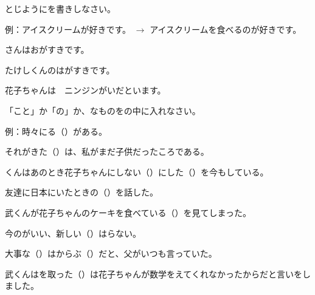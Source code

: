 
\author{Tomislav Mamić}

	
	\ten\begin{mondai}{とじようにを書きしなさい。}
		\itemsep0pt
		\item 例：アイスクリームが好きです。 $\rightarrow$ アイスクリームを食べるのが好きです。
		\item {}さんはおがすきです。
		\item たけしくんのは\hspace{10pt}がすきです。
		\item 花子ちゃんは　ニンジンがいだといます。
	\end{mondai}

	\vspace{20pt}
	\ten\begin{mondai}{「こと」か「の」か、なものをの中に入れなさい。}
		\itemsep0pt
		\item 例：時々にる（\hspace{20pt}）がある。
		\item それがきた（\hspace{20pt}）は、私がまだ子供だったころである。
		\item{}くんはあのとき花子ちゃんにしない（\hspace{20pt}）にした（\hspace{20pt}）を今もしている。
		\item 友達に日本にいたときの（\hspace{20pt}）を話した。
		\item 武くんが花子ちゃんのケーキを食べている（\hspace{20pt}）を見てしまった。
		\item 今のがいい、新しい（\hspace{20pt}）はらない。
		\item 大事な（\hspace{20pt}）はからぶ（\hspace{20pt}）だと、父がいつも言っていた。
		\item 武くんはを取った（\hspace{20pt}）は花子ちゃんが数学をえてくれなかったからだと言いをしました。
	\end{mondai}
